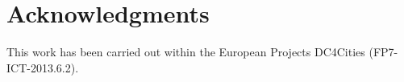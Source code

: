 \documentclass[10pt, conference, compsocconf]{IEEEtran}
\begin{document}
%
%
%
%
%
%





\section*{Acknowledgments}

This work has been carried out within the European Projects DC4Cities (FP7-ICT-2013.6.2).



\end{document}
